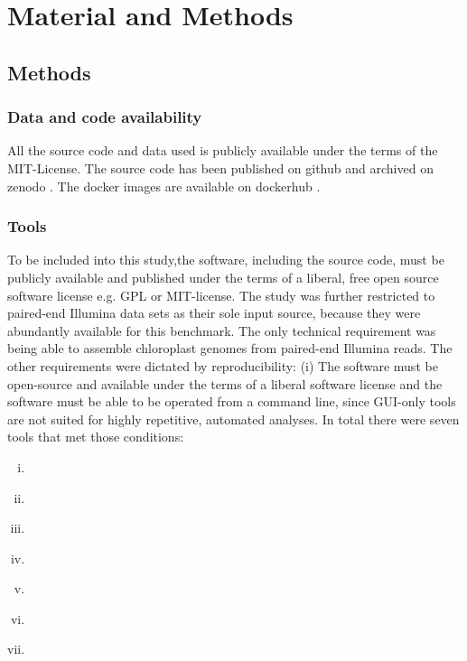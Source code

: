 \section{Material and Methods}
\subsection{Methods}
\subsubsection{Data and code availability}
All the source code and data used is publicly available under the terms of the MIT-License. The source code
has been published on github \cite{github-benchmark-repo} and archived on zenodo \cite{zenodorepo} . The
docker images are available on dockerhub \cite{dockerhub-benchmark}.

\subsubsection{Tools}
To be included into this study,the software, including the source code, must be publicly
available and published under the terms of a liberal, free open source software license
e.g. GPL or MIT-license. The study was further restricted to paired-end Illumina data sets
as their sole input source, because they were abundantly available for this benchmark.
The only technical requirement was being able to assemble chloroplast genomes from
paired-end Illumina reads. The other requirements were dictated by reproducibility: (i)
The software must be open-source and available under the terms of a liberal software
license and the software must be able to be operated from a command line, since GUI-only
tools are not suited for highly repetitive, automated analyses. In total there were seven
tools that met those conditions:

\begin{enumerate}[(i)]
\item \ce \hspace{0.5ex} \cite{j_ankenbrand_chloroextractor:_2018}
\item \cassp \hspace{0.5ex} \cite{sancho_comparative_2018}
\item \go \hspace{0.5ex} \cite{jin_getorganelle:_2018}
\item \oa \hspace{0.5ex} \cite{coissac_barcodes_2016}
\item \ioga \hspace{0.5ex} \cite{bakker_herbarium_2016}
\item \fp \hspace{0.5ex} \cite{mckain__fast-plast_2017}
\item \np \hspace{0.5ex} \cite{dierckxsens_novoplasty:_2017}
\end{enumerate}


